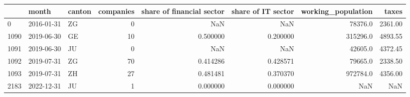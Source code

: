 \begin{tabular}{lllrrrrr}
\toprule
{} &      month & canton &  companies &  share of financial sector &  share of IT sector &  working\_population &    taxes \\
\midrule
0    & 2016-01-31 &     ZG &          0 &                        NaN &                 NaN &             78376.0 &  2361.00 \\
1090 & 2019-06-30 &     GE &         10 &                   0.500000 &            0.200000 &            315296.0 &  4893.55 \\
1091 & 2019-06-30 &     JU &          0 &                        NaN &                 NaN &             42605.0 &  4372.45 \\
1092 & 2019-07-31 &     ZG &         70 &                   0.414286 &            0.428571 &             79665.0 &  2338.50 \\
1093 & 2019-07-31 &     ZH &         27 &                   0.481481 &            0.370370 &            972784.0 &  4356.00 \\
2183 & 2022-12-31 &     JU &          1 &                   0.000000 &            0.000000 &                 NaN &      NaN \\
\bottomrule
\end{tabular}
